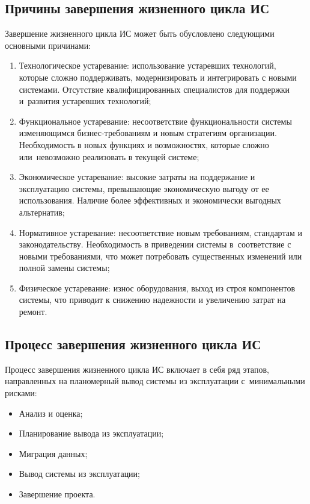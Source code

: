 \documentclass{ou}
\begin{document}
\subsection{Причины завершения жизненного цикла ИС}
Завершение жизненного цикла ИС может быть обусловлено следующими основными причинами:
\begin{enumerate}[leftmargin=0em, itemindent=3.75em, nosep, label=\arabic*)]
\item Технологическое устаревание: использование устаревших технологий, которые сложно поддерживать, модернизировать и интегрировать с новыми системами. Отсутствие квалифицированных специалистов для поддержки и~развития устаревших технологий;
\item Функциональное устаревание: несоответствие функциональности системы изменяющимся бизнес-требованиям и новым стратегиям организации. Необходимость в новых функциях и возможностях, которые сложно или~невозможно реализовать в текущей системе;
\item Экономическое устаревание: высокие затраты на поддержание и эксплуатацию системы, превышающие экономическую выгоду от ее использования. Наличие более эффективных и экономически выгодных альтернатив;
\item Нормативное устаревание: несоответствие новым требованиям, стандартам и законодательству. Необходимость в приведении системы в~соответствие с новыми требованиями, что может потребовать существенных изменений или полной замены системы;
\item Физическое устаревание: износ оборудования, выход из строя компонентов системы, что приводит к снижению надежности и увеличению затрат на ремонт.
\end{enumerate}
\subsection{Процесс завершения жизненного цикла ИС}
Процесс завершения жизненного цикла ИС включает в себя ряд этапов, направленных на планомерный вывод системы из эксплуатации с~минимальными рисками:
\begin{itemize}[label=-, leftmargin=0em, itemindent=3.35em, nosep]
\item Анализ и оценка;
\item Планирование вывода из эксплуатации;
\item Миграция данных;
\item Вывод системы из эксплуатации;
\item Завершение проекта.
\end{itemize}
\end{document}
